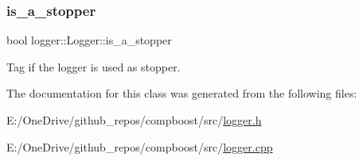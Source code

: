 \subsubsection{\texorpdfstring{is\+\_\+a\+\_\+stopper}{is\_a\_stopper}}
{\footnotesize\ttfamily bool logger\+::\+Logger\+::is\+\_\+a\+\_\+stopper\hspace{0.3cm}{\ttfamily [protected]}}



Tag if the logger is used as stopper. 



The documentation for this class was generated from the following files\+:\begin{DoxyCompactItemize}
\item 
E\+:/\+One\+Drive/github\+\_\+repos/compboost/src/\mbox{\hyperlink{logger_8h}{logger.\+h}}\item 
E\+:/\+One\+Drive/github\+\_\+repos/compboost/src/\mbox{\hyperlink{logger_8cpp}{logger.\+cpp}}\end{DoxyCompactItemize}

